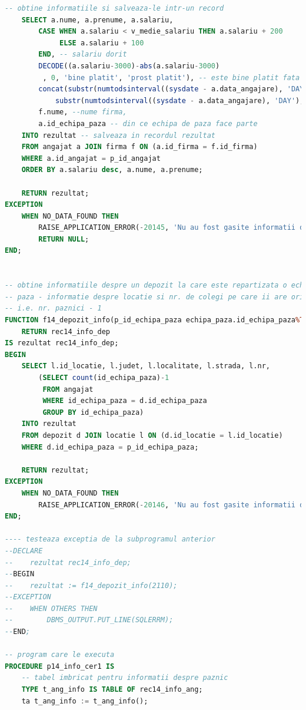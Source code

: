\documentclass[12pt, a4paper]{article}
\begin{document}
\begin{lstlisting}[language=SQL]
    -- obtine informatiile si salveaza-le intr-un record
    SELECT a.nume, a.prenume, a.salariu,
        CASE WHEN a.salariu < v_medie_salariu THEN a.salariu + 200
             ELSE a.salariu + 100
        END, -- salariu dorit
        DECODE((a.salariu-3000)-abs(a.salariu-3000)         
         , 0, 'bine platit', 'prost platit'), -- este bine platit fata de restul
        concat(substr(numtodsinterval((sysdate - a.data_angajare), 'DAY'), 8, 3) ||' zile ',
            substr(numtodsinterval((sysdate - a.data_angajare), 'DAY'), 12, 5)), -- vechime la locul de munca in firma
        f.nume, --nume firma,
        a.id_echipa_paza -- din ce echipa de paza face parte 
    INTO rezultat -- salveaza in recordul rezultat
    FROM angajat a JOIN firma f ON (a.id_firma = f.id_firma)
    WHERE a.id_angajat = p_id_angajat 
    ORDER BY a.salariu desc, a.nume, a.prenume;
    
    RETURN rezultat;
EXCEPTION
    WHEN NO_DATA_FOUND THEN
        RAISE_APPLICATION_ERROR(-20145, 'Nu au fost gasite informatii despre angajat. Angajatul nu exista!');
        RETURN NULL;
END;


-- obtine informatiile despre un depozit la care este repartizata o echipa de
-- paza - informatie despre locatie si nr. de colegi pe care ii are orice paznic
-- i.e. nr. paznici - 1
FUNCTION f14_depozit_info(p_id_echipa_paza echipa_paza.id_echipa_paza%TYPE)
    RETURN rec14_info_dep
IS rezultat rec14_info_dep;
BEGIN
    SELECT l.id_locatie, l.judet, l.localitate, l.strada, l.nr,
        (SELECT count(id_echipa_paza)-1
         FROM angajat 
         WHERE id_echipa_paza = d.id_echipa_paza
         GROUP BY id_echipa_paza)
    INTO rezultat
    FROM depozit d JOIN locatie l ON (d.id_locatie = l.id_locatie)
    WHERE d.id_echipa_paza = p_id_echipa_paza;
    
    RETURN rezultat;
EXCEPTION
    WHEN NO_DATA_FOUND THEN
        RAISE_APPLICATION_ERROR(-20146, 'Nu au fost gasite informatii despre depozitul in care este repartizata echipa de paza data!');
END;

---- testeaza exceptia de la subprogramul anterior
--DECLARE
--    rezultat rec14_info_dep;
--BEGIN
--    rezultat := f14_depozit_info(2110);
--EXCEPTION
--    WHEN OTHERS THEN
--        DBMS_OUTPUT.PUT_LINE(SQLERRM);
--END;

-- program care le executa
PROCEDURE p14_info_cer1 IS
    -- tabel imbricat pentru informatii despre paznic
    TYPE t_ang_info IS TABLE OF rec14_info_ang;
    ta t_ang_info := t_ang_info();
    

\end{lstlisting}
\end{document}
